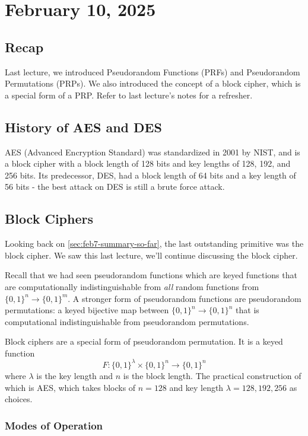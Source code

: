 \section{February 10, 2025}
\label{20250210}

\subsection{Recap}
Last lecture, we introduced Pseudorandom Functions (PRFs) and Pseudorandom Permutations (PRPs). We also introduced the concept of a block cipher, which is a special form of a PRP. Refer to last lecture's notes for a refresher.

\subsection{History of AES and DES}
AES (Advanced Encryption Standard) was standardized in 2001 by NIST, and is a block cipher with a block length of 128 bits and key lengths of 128, 192, and 256 bits. Its predecessor, DES, had a block length of 64 bits and a key length of 56 bits - the best attack on DES is still a brute force attack.

\subsection{Block Ciphers}
Looking back on \cref{sec:feb7-summary-so-far}, the last outstanding primitive was the block cipher. We saw this last lecture, we'll continue discussing the block cipher.

Recall that we had seen pseudorandom functions which are keyed functions that are computationally indistinguishable from \emph{all} random functions from $\{0, 1\}^n\to \{0, 1\}^m$. A stronger form of pseudorandom functions are pseudorandom permutations: a keyed bijective map between $\{0, 1\}^n\to \{0, 1\}^n$ that is computational indistinguishable from pseudorandom permutations.

Block ciphers are a special form of pseudorandom permutation. It is a keyed function
\[F : \{0, 1\}^\lambda\times \{0, 1\}^n\to \{0, 1\}^n\]
where $\lambda$ is the key length and $n$ is the block length. The practical construction of which is AES, which takes blocks of $n = 128$ and key length $\lambda = 128, 192, 256$ as choices.

\subsubsection{Modes of Operation}

